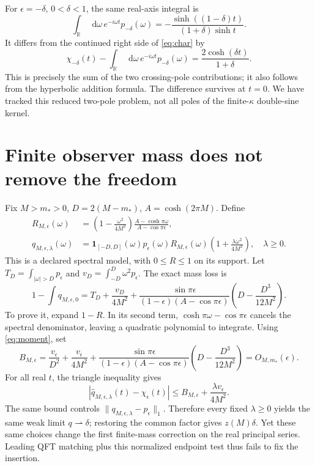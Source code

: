 \documentclass[11pt,a4paper]{article}
\newcommand{\dd}{\mathop{}\!\mathrm d}
\newcommand{\Id}{\mathbf 1}
\begin{document}
For \(\epsilon=-\delta\), \(0<\delta<1\), the same real-axis integral is
\begin{equation}
 \int_{\mathbb R}\dd\omega\,e^{-i\omega t}p_{-\delta}(\omega)
 =-\frac{\sinh((1-\delta)t)}{(1+\delta)\sinh t}.
\end{equation}
It differs from the continued right side of \eqref{eq:char} by
\begin{equation}
 \chi_{-\delta}(t)
 -\int_{\mathbb R}\dd\omega\,e^{-i\omega t}p_{-\delta}(\omega)
 =\frac{2\cosh(\delta t)}{1+\delta}. \label{eq:residues}
\end{equation}
This is precisely the sum of the two crossing-pole contributions;
it also follows from the hyperbolic addition formula.
The difference survives at \(t=0\).
We have tracked this reduced two-pole problem, not all poles of
the finite-\(\kappa\) double-sine kernel.

\section{Finite observer mass does not remove the freedom}
Fix \(M>m_*>0\), \(D=2(M-m_*)\), \(A=\cosh(2\pi M)\). Define
\begin{align}
 R_{M,\epsilon}(\omega)&=
 \left(1-\frac{\omega^2}{4M^2}\right)
 \frac{A-\cosh\pi\omega}{A-\cos\pi\epsilon},\\
 q_{M,\epsilon,\lambda}(\omega)&=
 \Id_{[-D,D]}(\omega)p_\epsilon(\omega)R_{M,\epsilon}(\omega)
 \left(1+\frac{\lambda\omega^2}{4M^2}\right),\quad\lambda\ge0 .
 \label{eq:q}
\end{align}
This is a declared spectral model, with \(0\le R\le1\) on its support.
Let \(T_D=\int_{|\omega|>D}p_\epsilon\) and
\(v_D=\int_{-D}^D\omega^2p_\epsilon\). The exact mass loss is
\begin{equation}
 1-\int q_{M,\epsilon,0}
 =T_D+\frac{v_D}{4M^2}
 +\frac{\sin\pi\epsilon}{(1-\epsilon)(A-\cos\pi\epsilon)}
 \left(D-\frac{D^3}{12M^2}\right). \label{eq:loss}
\end{equation}
To prove it, expand \(1-R\). In its second term,
\(\cosh\pi\omega-\cos\pi\epsilon\) cancels the spectral denominator,
leaving a quadratic polynomial to integrate.
Using \eqref{eq:moment}, set
\begin{equation}
 B_{M,\epsilon}=
 \frac{v_\epsilon}{D^2}+\frac{v_\epsilon}{4M^2}
 +\frac{\sin\pi\epsilon}{(1-\epsilon)(A-\cos\pi\epsilon)}
 \left(D-\frac{D^3}{12M^2}\right)=O_{M,m_*}(\epsilon).
\end{equation}
For all real \(t\), the triangle inequality gives
\begin{equation}
 |\widehat q_{M,\epsilon,\lambda}(t)-\chi_\epsilon(t)|
 \le B_{M,\epsilon}+\frac{\lambda v_\epsilon}{4M^2}.
 \label{eq:bound}
\end{equation}
The same bound controls \(\|q_{M,\epsilon,\lambda}-p_\epsilon\|_1\).
Therefore every fixed \(\lambda\ge0\) yields the same weak limit
\(q\rightharpoonup\delta\); restoring the common factor gives
\(z(M)\delta\). Yet these same choices change the first finite-mass
correction on the real principal series. Leading QFT matching plus
this normalized endpoint test thus fails to fix the insertion.
\end{document}
